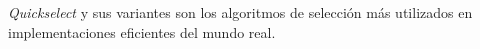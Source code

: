 \emph{Quickselect} y sus variantes son los algoritmos de selección más utilizados en implementaciones eficientes del mundo real.